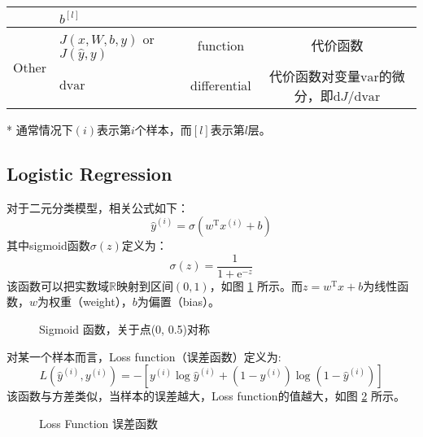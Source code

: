 \begin{table}[h]
\begin{threeparttable}
\begin{tabular}{clcc}
									& $b^{[l]}$                                 &                      &                                                                    \\ \hline
		\multirow{2}{*}{Other}   & $J(x,W,b,y)$ or $J(\hat{y},y)$            & function             & 代价函数                                                               \\
									& $\mathrm{d}\mathrm{var}$                  & differential         & 代价函数对变量$\mathrm{var}$的微分，即${\mathrm{d}J}/{\mathrm{d}\mathrm{var}}$ \\ \hline
	\end{tabular}
	\label{tab:notations} %
	\begin{tablenotes}
		\item[*] 通常情况下$(i)$表示第$i$个样本，而$[l]$表示第$l$层。
	\end{tablenotes}
	\end{threeparttable}
\end{table}

\subsection{Logistic Regression}

对于二元分类模型，相关公式如下：
\begin{equation}
	\hat{y}^{(i)} = \sigma(w^\mathrm{T} x^{(i)} + b) \label{eq:logistic}
\end{equation}
其中sigmoid函数$\sigma(z)$定义为：
\begin{equation}
	\sigma(z) = \frac{1}{1 + \mathrm{e}^{-z}} \label{eq:sigmoid}
\end{equation}
该函数可以把实数域$\mathbb{R}$映射到区间$(0, 1)$，如图 \ref{fig:sigmoid} 所示。而$z = w^\mathrm{T} x + b$为线性函数，$w$为权重（weight），$b$为偏置（bias）。
\begin{figure}[h]
	\centering
	
	\caption{Sigmoid 函数，关于点(0, 0.5)对称}
	\label{fig:sigmoid}
\end{figure}

\vspace{0.5\baselineskip}
对某一个样本而言，Loss function（误差函数）定义为:
\begin{equation}
	L(\hat{y}^{(i)}, y^{(i)}) = -[y^{(i)} \log \hat{y}^{(i)} + (1 - y^{(i)}) \log (1 - \hat{y}^{(i)})] \label{eq:loss}
\end{equation}
该函数与方差类似，当样本的误差越大，Loss function的值越大，如图 \ref{fig:loss} 所示。
\begin{figure}[h]
	\centering
	
	\caption{Loss Function 误差函数}
	\label{fig:loss}
\end{figure}


